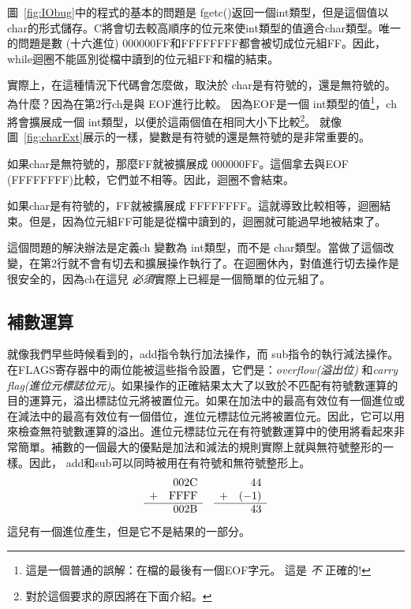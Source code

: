 圖~\ref{fig:IObug}中的程式的基本的問題是
{\code fgetc()}返回一個{\code int}類型，但是這個值以{\code char}的形式儲存。C將會切去較高順序的位元來使{\code int}類型的值適合{\code char}類型。唯一的問題是數
(十六進位) {\code 000000FF}和{\code FFFFFFFF}都會被切成位元組{\code FF}。因此，while迴圈不能區別從檔中讀到的位元組{\code FF}和檔的結束。

實際上，在這種情況下代碼會怎麼做，取決於{\code
char}是有符號的，還是無符號的。為什麼？因為在第2行{\code ch}是與
{\code EOF}進行比較。 因為{\code EOF}是一個{\code
int}類型的值\footnote{這是一個普通的誤解：在檔的最後有一個EOF字元。
這是 \emph{不} 正確的!}，{\code ch}將會擴展成一個{\code
int}類型，以便於這兩個值在相同大小下比較\footnote{對於這個要求的原因將在下面介紹。}。
就像圖~\ref{fig:charExt}展示的一樣，變數是有符號的還是無符號的是非常重要的。

如果{\code char}是無符號的，那麼{\code FF}就被擴展成 {\code
000000FF}。這個拿去與{\code EOF} ({\code FFFFFFFF})比較，它們並不相等。因此，迴圈不會結束。

如果{\code char}是有符號的，{\code FF}就被擴展成{\code
FFFFFFFF}。這就導致比較相等，迴圈結束。但是，因為位元組{\code FF}可能是從檔中讀到的，迴圈就可能過早地被結束了。

這個問題的解決辦法是定義{\code ch} 變數為
{\code int}類型，而不是 {\code char}類型。當做了這個改變，在第2行就不會有切去和擴展操作執行了。在迴圈休內，對值進行切去操作是很安全的，因為{\code ch}在這兒 \emph{必須}實際上已經是一個簡單的位元組了。

 

\subsection{補數運算 }

就像我們早些時候看到的，{\code add}指令執行加法操作，而{\code
sub}指令的執行減法操作。在FLAGS寄存器中的兩位能被這些指令設置，它們是：\emph{overflow(溢出位)}
和\emph{carry
flag(進位元標誌位元)}。如果操作的正確結果太大了以致於不匹配有符號數運算的目的運算元，溢出標誌位元將被置位元。如果在加法中的最高有效位有一個進位或在減法中的最高有效位有一個借位，進位元標誌位元將被置位元。因此，它可以用來檢查無符號數運算的溢出。進位元標誌位元在有符號數運算中的使用將看起來非常簡單。補數的一個最大的優點是加法和減法的規則實際上就與無符號整形的一樣。因此，
{\code add}和{\code sub}可以同時被用在有符號和無符號整形上。
\[
\begin{array}{rrcrr}
 & 002\mathrm{C} & & & 44\\
+& \mathrm{FFFF} & &+&(-1)\\ \cline{1-2} \cline{4-5}
 & 002\mathrm{B} & & & 43
\end{array}
\]
這兒有一個進位產生，但是它不是結果的一部分。

